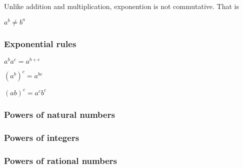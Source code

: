 Unlike addition and multiplication, exponention is not commutative. That is

$a^b\ne b^a$

\subsubsection{Exponential rules}

$a^ba^c=a^{b+c}$

$(a^b)^c=a^{bc}$

$(ab)^c=a^cb^c$

\subsubsection{Powers of natural numbers}

\subsubsection{Powers of integers}

\subsubsection{Powers of rational numbers}


